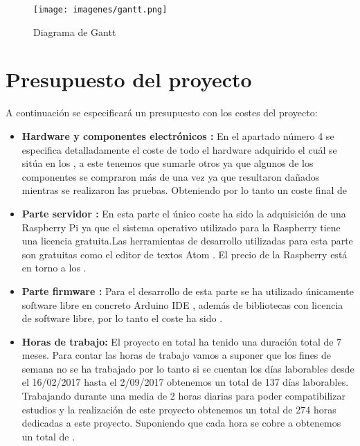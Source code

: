 \begin{landscape}
	
	\begin{figure}
		\centering
		\texttt{[image: imagenes/gantt.png]}
		\caption{Diagrama de Gantt}
		\label{fig:Diagrama de Gantt}
	\end{figure}
	
\end{landscape}

\section{Presupuesto del proyecto}

A continuación se especificará un presupuesto con los costes del proyecto:

\begin{itemize}
	\item\textbf{Hardware y componentes electrónicos :} En el apartado número 4 se especifica detalladamente el coste de todo el hardware adquirido el cuál se sitúa en los \textbf{}, a este tenemos que sumarle otros  ya que algunos de los componentes se compraron más de una vez ya que resultaron dañados mientras se realizaron las pruebas. Obteniendo por lo tanto un coste final de \textbf{}
	
	\item\textbf{Parte servidor :} En esta parte el único coste ha sido la adquisición de una Raspberry Pi ya que el sistema operativo utilizado para la Raspberry tiene una licencia gratuita.Las herramientas de desarrollo utilizadas para esta parte son gratuitas como el editor de textos Atom \cite{atom}. El precio de la Raspberry está en torno a los \textbf{}.
	
	\item\textbf{Parte firmware :} Para el desarrollo de esta parte se ha utilizado únicamente software libre en concreto Arduino IDE \cite{arduinoide}, además de bibliotecas con licencia de software libre, por lo tanto el coste ha sido \textbf{}.
	
	\item\textbf{Horas de trabajo:} El proyecto en total ha tenido una duración total de 7 meses. Para contar las horas de trabajo vamos a suponer que los fines de semana no se ha trabajado por lo tanto si se cuentan los días laborables desde el 16/02/2017 hasta el 2/09/2017 obtenemos un total de 137 días laborables. Trabajando durante una media de 2 horas diarias para poder compatibilizar estudios y la realización de este proyecto obtenemos un total de 274 horas dedicadas a este proyecto. Suponiendo que cada hora se cobre a  obtenemos un total de \textbf{}.
	

\end{itemize}
